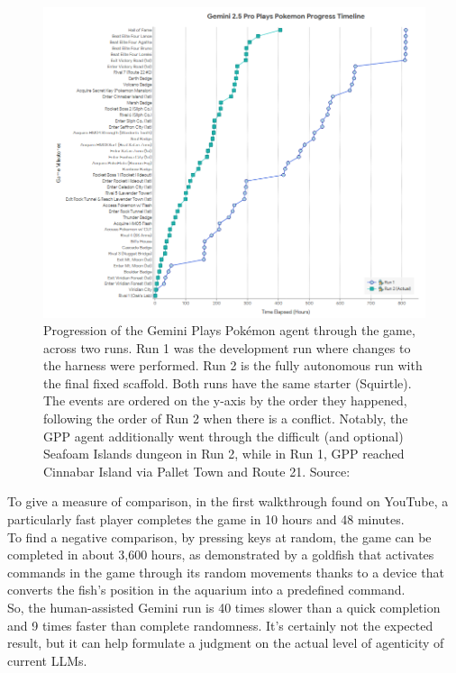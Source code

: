 \documentclass[12pt]{article}
\begin{document}
    \begin{figure}[H]
    \centering
            \includegraphics[width=1\textwidth]{GeminiFireRed.png}
    \caption[Gemini plays Pokemon]{Progression of the Gemini Plays Pokémon agent through the game, across two runs. Run 1 was the development run where changes to the harness were performed. Run 2 is the fully autonomous run with the final fixed scaffold. Both runs have the same starter (Squirtle). The events are ordered on the y-axis by the order they happened, following the order of Run 2 when there is a conflict. Notably, the GPP agent additionally went through the difficult (and optional) Seafoam Islands dungeon in Run 2, while in Run 1, GPP reached Cinnabar Island via Pallet Town and Route 21. Source: \cite{comanici2025gemini25pushingfrontier}}
    \end{figure}  

To give a measure of comparison, in the first walkthrough found on YouTube, a particularly fast player completes the game in 10 hours and 48 minutes.\cite{FireRedHumanWalkthrough}\\
To find a negative comparison, by pressing keys at random, the game can be completed in about 3,600 hours, as demonstrated by a goldfish that activates commands in the game through its random movements thanks to a device that converts the fish's position in the aquarium into a predefined command.\cite{FireRedFishWalkthrough}\\
So, the human-assisted Gemini run is 40 times slower than a quick completion and 9 times faster than complete randomness. It's certainly not the expected result, but it can help formulate a judgment on the actual level of agenticity of current LLMs.
\end{document}
